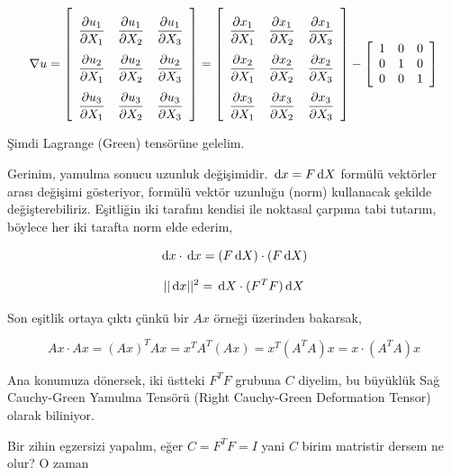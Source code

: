 \documentclass[12pt,fleqn]{article}\usepackage{../../common}
\begin{document}
$$
\renewcommand*{\arraystretch}{2.5}
\nabla u =
\left[\begin{array}{ccc}
\dfrac{\partial u_1}{\partial X_1} & \dfrac{\partial u_1}{\partial X_2} & \dfrac{\partial u_1}{\partial X_3} \\
\dfrac{\partial u_2}{\partial X_1} & \dfrac{\partial u_2}{\partial X_2} & \dfrac{\partial u_2}{\partial X_3} \\
\dfrac{\partial u_3}{\partial X_1} & \dfrac{\partial u_3}{\partial X_2} & \dfrac{\partial u_3}{\partial X_3} 
\end{array}\right] = 
\left[\begin{array}{ccc}
\dfrac{\partial x_1}{\partial X_1} & \dfrac{\partial x_1}{\partial X_2} & \dfrac{\partial x_1}{\partial X_3} \\
\dfrac{\partial x_2}{\partial X_1} & \dfrac{\partial x_2}{\partial X_2} & \dfrac{\partial x_2}{\partial X_3} \\
\dfrac{\partial x_3}{\partial X_1} & \dfrac{\partial x_3}{\partial X_2} & \dfrac{\partial x_3}{\partial X_3} 
\end{array}\right] -
\renewcommand*{\arraystretch}{1.0}
\left[\begin{array}{ccc}
1 & 0 & 0 \\ 0 & 1 & 0 \\ 0 & 0 & 1
\end{array}\right]
$$





Şimdi Lagrange (Green) tensörüne gelelim.

Gerinim, yamulma sonucu uzunluk değişimidir. $\,\mathrm{d} x = F \,\mathrm{d} X$ formülü vektörler
arası değişimi gösteriyor, formülü vektör uzunluğu (norm) kullanacak şekilde
değişterebiliriz. Eşitliğin iki tarafını kendisi ile noktasal çarpıma tabi
tutarım, böylece her iki tarafta norm elde ederim,

$$
\,\mathrm{d} x \cdot \,\mathrm{d} x  = (F \,\mathrm{d} X) \cdot (F \,\mathrm{d} X)
$$

$$
||\,\mathrm{d} x||^2  = \,\mathrm{d} X \cdot (F^T F) \,\mathrm{d} X
$$

Son eşitlik ortaya çıktı çünkü bir $Ax$ örneği üzerinden bakarsak,

$$
Ax \cdot Ax = (Ax)^T Ax = x^T A^T (Ax) = x^T (A^T A) x  = x \cdot (A^T A) x
$$

Ana konumuza dönersek, iki üstteki $F^T F$ grubuna $C$ diyelim, bu büyüklük
Sağ Cauchy-Green Yamulma Tensörü (Right Cauchy-Green Deformation Tensor)
olarak biliniyor.

Bir zihin egzersizi yapalım, eğer $C = F^T F = I$ yani $C$ birim matristir
dersem ne olur? O zaman
\end{document}
